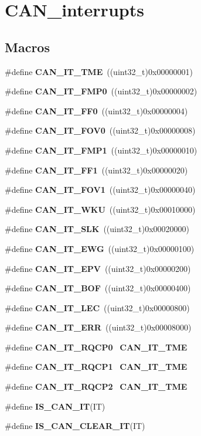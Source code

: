 \section{C\+A\+N\+\_\+interrupts}
\label{group__CAN__interrupts}
\subsection*{Macros}
\begin{DoxyCompactItemize}
\item 
\#define \textbf{ C\+A\+N\+\_\+\+I\+T\+\_\+\+T\+ME}~((uint32\+\_\+t)0x00000001)
\item 
\#define \textbf{ C\+A\+N\+\_\+\+I\+T\+\_\+\+F\+M\+P0}~((uint32\+\_\+t)0x00000002)
\item 
\#define \textbf{ C\+A\+N\+\_\+\+I\+T\+\_\+\+F\+F0}~((uint32\+\_\+t)0x00000004)
\item 
\#define \textbf{ C\+A\+N\+\_\+\+I\+T\+\_\+\+F\+O\+V0}~((uint32\+\_\+t)0x00000008)
\item 
\#define \textbf{ C\+A\+N\+\_\+\+I\+T\+\_\+\+F\+M\+P1}~((uint32\+\_\+t)0x00000010)
\item 
\#define \textbf{ C\+A\+N\+\_\+\+I\+T\+\_\+\+F\+F1}~((uint32\+\_\+t)0x00000020)
\item 
\#define \textbf{ C\+A\+N\+\_\+\+I\+T\+\_\+\+F\+O\+V1}~((uint32\+\_\+t)0x00000040)
\item 
\#define \textbf{ C\+A\+N\+\_\+\+I\+T\+\_\+\+W\+KU}~((uint32\+\_\+t)0x00010000)
\item 
\#define \textbf{ C\+A\+N\+\_\+\+I\+T\+\_\+\+S\+LK}~((uint32\+\_\+t)0x00020000)
\item 
\#define \textbf{ C\+A\+N\+\_\+\+I\+T\+\_\+\+E\+WG}~((uint32\+\_\+t)0x00000100)
\item 
\#define \textbf{ C\+A\+N\+\_\+\+I\+T\+\_\+\+E\+PV}~((uint32\+\_\+t)0x00000200)
\item 
\#define \textbf{ C\+A\+N\+\_\+\+I\+T\+\_\+\+B\+OF}~((uint32\+\_\+t)0x00000400)
\item 
\#define \textbf{ C\+A\+N\+\_\+\+I\+T\+\_\+\+L\+EC}~((uint32\+\_\+t)0x00000800)
\item 
\#define \textbf{ C\+A\+N\+\_\+\+I\+T\+\_\+\+E\+RR}~((uint32\+\_\+t)0x00008000)
\item 
\#define \textbf{ C\+A\+N\+\_\+\+I\+T\+\_\+\+R\+Q\+C\+P0}~\textbf{ C\+A\+N\+\_\+\+I\+T\+\_\+\+T\+ME}
\item 
\#define \textbf{ C\+A\+N\+\_\+\+I\+T\+\_\+\+R\+Q\+C\+P1}~\textbf{ C\+A\+N\+\_\+\+I\+T\+\_\+\+T\+ME}
\item 
\#define \textbf{ C\+A\+N\+\_\+\+I\+T\+\_\+\+R\+Q\+C\+P2}~\textbf{ C\+A\+N\+\_\+\+I\+T\+\_\+\+T\+ME}
\item 
\#define \textbf{ I\+S\+\_\+\+C\+A\+N\+\_\+\+IT}(IT)
\item 
\#define \textbf{ I\+S\+\_\+\+C\+A\+N\+\_\+\+C\+L\+E\+A\+R\+\_\+\+IT}(IT)
\end{DoxyCompactItemize}



